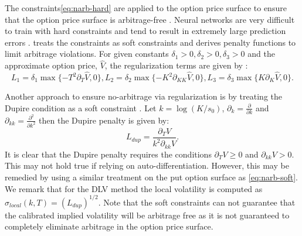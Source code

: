 \documentclass{article}
\theoremstyle{plain}%
\theoremstyle{definition}
\theoremstyle{remark}
\begin{document}
The constraints\eqref{eq:narb-hard} are applied to the option price surface to ensure that the option price surface is arbitrage-free \citep{carr-2005}. Neural networks are very difficult to train with hard constraints and tend to result in extremely large prediction errors \citep{ackerer-2020}. \citep{itkin-2019} treats the constraints as soft constraints and derives penalty functions to limit arbitrage violations. For given constants $\delta_1>0,\delta_2>0,\delta_3 > 0$ and the approximate option price, $\hat{V}$, the regularization terms are given by \citep{itkin-2019}:
\begin{equation}
    L_1 = \delta_1 \max\{-T^2\partial_T\hat{V},0\}, L_2 = \delta_2 \max\{-K^2\partial_{KK}\hat{V},0\}, L_3 = \delta_3 \max\{K\partial_K\hat{V},0\}.
    \label{eq:narb-soft}
\end{equation}

Another approach to ensure no-arbitrage via regularization is by treating the Dupire condition \citep{dupire-1994} as a soft constraint \citep{chataigner-2020}. Let $k = \log(K/s_0)$, $\partial_k = \frac{\partial}{\partial k}$ and $\partial_{kk} = \frac{\partial^2}{\partial k^2}$ then the Dupire penalty is given by:
\begin{equation*}
    L_{dup} = \frac{\partial_T V}{k^2\partial_{kk}V}.
\end{equation*}
It is clear that the Dupire penalty requires the conditions $\partial_T V \geq 0$ and $\partial_{kk} V > 0$. This may not hold true if relying on auto-differentiation. However, this may be remedied by using a similar treatment on the put option surface as \eqref{eq:narb-soft}. We remark that for the DLV method the local volatility is computed as $\sigma_{local}(k,T) = (L_{dup})^{1/2}$. Note that the soft constraints can not guarantee that the calibrated implied volatility will be arbitrage free as it is not guaranteed to completely eliminate arbitrage in the option price surface. 
\end{document}
